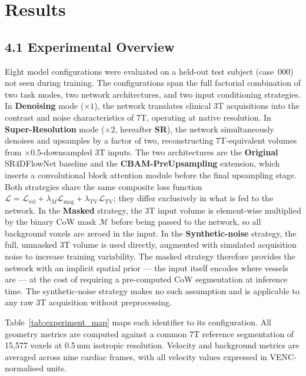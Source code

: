 \section*{Results}

\subsection*{4.1 Experimental Overview}

Eight model configurations were evaluated on a held-out test subject (case~000) not seen during
training.  The configurations span the full factorial combination of two task modes, two network
architectures, and two input conditioning strategies.  In \textbf{Denoising} mode ($\times 1$),
the network translates clinical 3T acquisitions into the contrast and noise characteristics of
7T, operating at native resolution.  In \textbf{Super-Resolution} mode ($\times 2$, hereafter
\textbf{SR}), the network simultaneously denoises and upsamples by a factor of two, reconstructing
7T-equivalent volumes from $\times 0.5$-downsampled 3T inputs.  The two architectures are the
\textbf{Original} SR4DFlowNet baseline and the \textbf{CBAM-PreUpsampling} extension, which
inserts a convolutional block attention module before the final upsampling stage.  Both strategies share the same composite loss function
$\mathcal{L} = \mathcal{L}_\text{vel} + \lambda_M\mathcal{L}_\text{mag} +
\lambda_\text{TV}\mathcal{L}_\text{TV}$; they differ exclusively in what is fed to the network.
In the \textbf{Masked} strategy, the 3T input volume is element-wise multiplied by the binary
CoW mask $\mathcal{M}$ before being passed to the network, so all background voxels are zeroed
in the input.  In the \textbf{Synthetic-noise} strategy, the full, unmasked 3T volume is used
directly, augmented with simulated acquisition noise to increase training variability.  The
masked strategy therefore provides the network with an implicit spatial prior --- the input
itself encodes where vessels are --- at the cost of requiring a pre-computed CoW segmentation at
inference time.  The synthetic-noise strategy makes no such assumption and is applicable to any
raw 3T acquisition without preprocessing.

Table~\ref{tab:experiment_map} maps each identifier to its configuration.  All geometry metrics
are computed against a common 7T reference segmentation of 15{,}577 voxels at 0.5\,mm isotropic
resolution.  Velocity and background metrics are averaged across nine cardiac frames, with all
velocity values expressed in VENC-normalised units.


